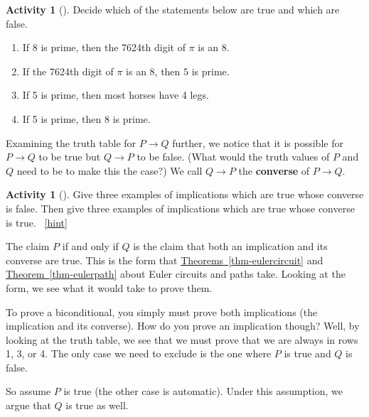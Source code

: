 \documentclass[10pt,]{book}
\newcommand{\terminology}[1]{\textbf{#1}}
\theoremstyle{plain}
\theoremstyle{definition}
\theoremstyle{definition}
\theoremstyle{definition}
\newtheorem{activity}[project]{Activity}
\numberwithin{equation}{chapter}
\def\imp{\rightarrow}
\begin{document}
\begin{activity}[]\label{activity-272}
\hypertarget{p-1395}{}%
Decide which of the statements below are true and which are false.%
\begin{enumerate}[font=\bfseries,label=(\alph*),ref=\alph*]
\item\label{task-229} \hypertarget{p-1396}{}%
If 8 is prime, then the 7624th digit of \(\pi\) is an 8.%
\item\label{task-230} \hypertarget{p-1397}{}%
If the 7624th digit of \(\pi\) is an 8, then \(5\) is prime.%
\item\label{task-231} \hypertarget{p-1398}{}%
If 5 is prime, then most horses have 4 legs.%
\item\label{task-232} \hypertarget{p-1399}{}%
If 5 is prime, then 8 is prime.%
\end{enumerate}
\end{activity}
\hypertarget{p-1400}{}%
Examining the truth table for \(P \imp Q\) further, we notice that it is possible for \(P \imp Q\) to be true but \(Q \imp P\) to be false. (What would the truth values of \(P\) and \(Q\) need to be to make this the case?) We call \(Q \imp P\) the \terminology{converse} of \(P \imp Q\).%
\begin{activity}[]\label{activity-273}
\hypertarget{p-1401}{}%
Give three examples of implications which are true whose converse is false.  Then give three examples of implications which are true whose converse is true.%
~\hfill{\tiny\hyperlink{a-278}{[hint]}\hypertarget{q-278}{}}\end{activity}
\hypertarget{p-1403}{}%
The claim \(P\) if and only if \(Q\) is the claim that both an implication and its converse are true.  This is the form that \hyperref[thm-eulercircuit]{Theorems~\ref{thm-eulercircuit}} and \hyperref[thm-eulerpath]{Theorem~\ref{thm-eulerpath}} about Euler circuits and paths take.  Looking at the form, we see what it would take to prove them.%
\par
\hypertarget{p-1404}{}%
To prove a biconditional, you simply must prove both implications (the implication and its converse).  How do you prove an implication though?  Well, by looking at the truth table, we see that we must prove that we are always in rows 1, 3, or 4.  The only case we need to exclude is the one where \(P\) is true and \(Q\) is false.%
\par
\hypertarget{p-1405}{}%
So assume \(P\) is true (the other case is automatic).  Under this assumption, we argue that \(Q\) is true as well.%
\par
\end{document}
